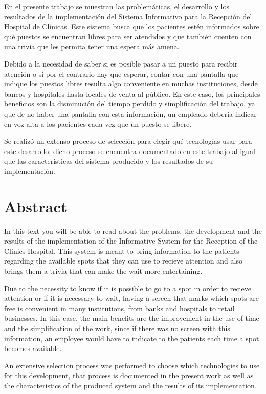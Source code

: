 \documentclass{article}
\begin{document}
En el presente trabajo se muestran las problemáticas, el desarrollo y los resultados de la implementación del Sistema Informativo para la Recepción del Hospital de Clínicas. Este sistema busca que los pacientes estén informados sobre qué puestos se encuentran libres para ser atendidos y que también cuenten con una trivia que les permita tener una espera más amena.

Debido a la necesidad de saber si es posible pasar a un puesto para recibir atención o si por el contrario hay que esperar, contar con una pantalla que indique los puestos libres resulta algo conveniente en muchas instituciones, desde bancos y hospitales hasta locales de venta al público. En este caso, los principales beneficios son la disminución del tiempo perdido y simplificación del trabajo, ya que de no haber una pantalla con esta información, un empleado debería indicar en voz alta a los pacientes cada vez que un puesto se libere.

Se realizó un extenso proceso de selección para elegir qué tecnologías usar para este desarrollo, dicho proceso se encuentra documentado en este trabajo al igual que las características del sistema producido y los resultados de su implementación.
\newpage
\
\newpage
\section*{Abstract}

In this text you will be able to read about the problems, the development and the results of the implementation of the Informative System for the Reception of the Clinics Hospital. This system is meant to bring information to the patients regarding the available spots that they can use to recieve attention and also brings them a trivia that can make the wait more entertaining.

Due to the necessity to know if it is possible to go to a spot in order to recieve attention or if it is necessary to wait, having a screen that marks which spots are free is convenient in many institutions, from banks and hospitals to retail businesses. In this case, the main benefits are the improvement in the use of time and the simplification of the work, since if there was no screen with this information, an employee would have to indicate to the patients each time a spot becomes available.

An extensive selection process was performed to choose which technologies to use for this development, that process is documented in the present work as well as the characteristics of the produced system and the results of its implementation.
\newpage
\
\newpage
\end{document}
